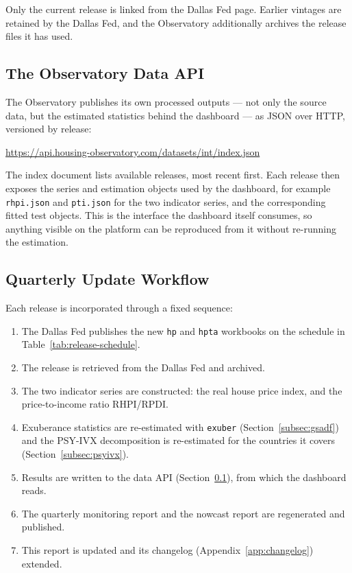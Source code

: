 Only the current release is linked from the Dallas Fed page. Earlier
vintages are retained by the Dallas Fed, and the Observatory additionally
archives the release files it has used.

\subsection{The Observatory Data API}
\label{subsec:api}

The Observatory publishes its own processed outputs --- not only the source
data, but the estimated statistics behind the dashboard --- as JSON over
HTTP, versioned by release:
\begin{center}
  \url{https://api.housing-observatory.com/datasets/int/index.json}
\end{center}

The index document lists available releases, most recent first. Each release
then exposes the series and estimation objects used by the dashboard, for
example \texttt{rhpi.json} and \texttt{pti.json} for the two indicator
series, and the corresponding fitted test objects. This is the interface the
dashboard itself consumes, so anything visible on the platform can be
reproduced from it without re-running the estimation.

\subsection{Quarterly Update Workflow}

Each release is incorporated through a fixed sequence:

\begin{enumerate}
  \item The Dallas Fed publishes the new \texttt{hp} and \texttt{hpta}
        workbooks on the schedule in Table~\ref{tab:release-schedule}.
  \item The release is retrieved from the Dallas Fed and archived.
  \item The two indicator series are constructed: the real house price index,
        and the price-to-income ratio RHPI/RPDI.
  \item Exuberance statistics are re-estimated with \texttt{exuber}
        (Section~\ref{subsec:gsadf}) and the PSY-IVX decomposition is
        re-estimated for the countries it covers
        (Section~\ref{subsec:psyivx}).
  \item Results are written to the data API
        (Section~\ref{subsec:api}), from which the dashboard reads.
  \item The quarterly monitoring report and the nowcast report are
        regenerated and published.
  \item This report is updated and its changelog
        (Appendix~\ref{app:changelog}) extended.
\end{enumerate}
